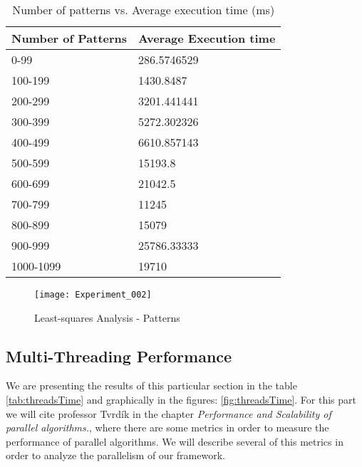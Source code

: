 \begin{table}\centering
	\caption{Number of patterns vs. Average execution time (ms)}\label{tab:patternTime}
   	\begin{tabular}{ | p{4cm\textwidth} | p{4cm\textwidth} |}
   	\hline
\textbf{Number of Patterns}  & \textbf{Average Execution time}       \\\hline
0-99       & 286.5746529 \\\hline
100-199    & 1430.8487   \\\hline
200-299    & 3201.441441 \\\hline
300-399    & 5272.302326 \\\hline
400-499    & 6610.857143 \\\hline
500-599    & 15193.8     \\\hline
600-699    & 21042.5     \\\hline
700-799    & 11245       \\\hline
800-899    & 15079       \\\hline
900-999    & 25786.33333 \\\hline
1000-1099  & 19710      \\\hline

    \end{tabular}
\end{table}

\begin{figure}\centering
	\texttt{[image: Experiment\_002]}
	\caption{Least-squares Analysis - Patterns}\label{fig:Experiment_002}
\end{figure}


\subsection{Multi-Threading Performance}

We are presenting the results of this particular section in the table \ref{tab:threadsTime} and graphically in the figures: \ref{fig:threadsTime}. For this part we will cite professor Tvrdík \cite[p. 3-9]{T2011} in the chapter \emph{Performance and Scalability of parallel algorithms.}, where there are some metrics in order to measure the performance of parallel algorithms. We will describe several of this metrics in order to analyze the parallelism of our framework.

